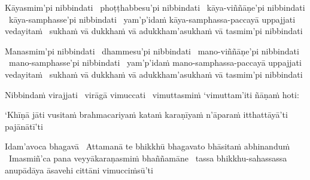 \begin{pali-hang}
  Kāyasmim'pi nibbindati \breathmark\ phoṭṭhabbesu'pi nibbindati \breathmark\ kāya-viññāṇe'pi nibbindati \breathmark\ kāya-samphasse'pi nibbindati \breathmark\ yam'p'idaṁ kāya-samphassa-paccayā uppajjati vedayitaṁ \breathmark\ sukhaṁ vā dukkhaṁ vā adukkham'asukhaṁ vā tasmim'pi nibbindati
\end{pali-hang}

\begin{pali-hang}
  Manasmim'pi nibbindati \breathmark\ dhammesu'pi nibbindati \breathmark\ mano-viññāṇe'pi nibbindati \breathmark\ mano-samphasse'pi nibbindati \breathmark\ yam'p'idaṁ mano-samphassa-paccayā uppajjati vedayitaṁ \breathmark\ sukhaṁ vā dukkhaṁ vā adukkham'asukhaṁ vā tasmim'pi nibbindati
\end{pali-hang}

\begin{pali-hang}
  Nibbindaṁ virajjati \breathmark\ virāgā vimuccati \breathmark\ vimuttasmiṁ `vimuttam'iti ñāṇaṁ hoti:
\end{pali-hang}

\begin{pali-hang}
  `Khīṇā jāti vusitaṁ brahmacariyaṁ kataṁ karaṇīyaṁ n'āparaṁ itthattāyā'ti pajānātī'ti
\end{pali-hang}

\begin{pali-hang}
  Idam'avoca bhagavā \breathmark\ Attamanā te bhikkhū bhagavato bhāsitaṁ abhinanduṁ \breathmark\ Imasmiñ'ca pana veyyākaraṇasmiṁ bhaññamāne \breathmark\ tassa bhikkhu-sahassassa anupādāya āsavehi cittāni vimucciṁsū'ti
\end{pali-hang}

\suttaRef{[SN 35.28]}

\ifdigitalversion{}\fi
